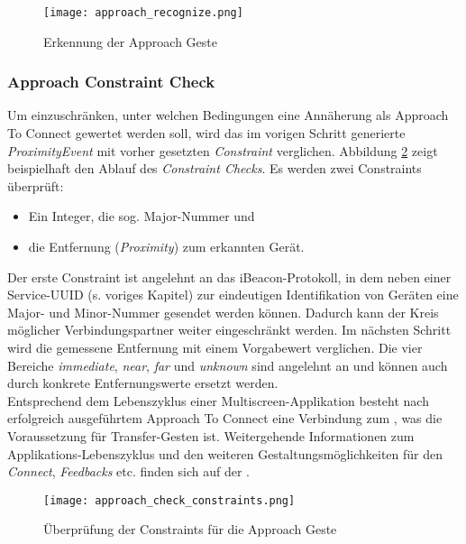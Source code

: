 {\begin{figure}[h]
\texttt{[image: approach\_recognize.png]}
\caption{Erkennung der Approach Geste}
\label{recognize_approach}
\end{figure}

\subsubsection*{Approach Constraint Check}
Um einzuschränken, unter welchen Bedingungen eine Annäherung als Approach To Connect gewertet werden soll, wird das im vorigen Schritt generierte \textit{ProximityEvent} mit vorher gesetzten \textit{Constraint} verglichen. Abbildung \ref{check_approach_constraints} zeigt beispielhaft den Ablauf des \textit{Constraint Checks}. Es werden zwei Constraints überprüft:
\begin{itemize}
\item Ein Integer, die sog. Major-Nummer und
\item die Entfernung (\textit{Proximity}) zum erkannten Gerät.
\end{itemize}
Der erste Constraint ist angelehnt an das iBeacon-Protokoll, in dem neben einer Service-UUID (s. voriges Kapitel) zur eindeutigen Identifikation von Geräten eine Major- und Minor-Nummer gesendet werden können. Dadurch kann der Kreis möglicher Verbindungspartner weiter eingeschränkt werden.
Im nächsten Schritt wird die gemessene Entfernung mit einem Vorgabewert verglichen. Die vier Bereiche \textit{immediate}, \textit{near}, \textit{far} und \textit{unknown} sind angelehnt an \cite{Marquardt2015} und können auch durch konkrete Entfernungswerte ersetzt werden.\\

Entsprechend dem Lebenszyklus einer Multiscreen-Applikation besteht nach erfolgreich
ausgeführtem Approach To Connect eine Verbindung zum \recdev{}, was die Voraussetzung für Transfer-Gesten ist.
Weitergehende Informationen zum Applikations-Lebenszyklus und den weiteren
Gestaltungsmöglichkeiten für den \textit{Connect}, \textit{Feedbacks} etc. finden sich
auf der \developerpage.

\begin{figure}[h]
\texttt{[image: approach\_check\_constraints.png]}
\caption{Überprüfung der Constraints für die Approach Geste}
\label{check_approach_constraints}
\end{figure}
}


\newcommand{\authors}{Horst Schneider, Hochschule Mannheim\\
Dominick Madden, Hochschule Mannheim\\
Valentina Burjan, Hochschule Mannheim}
\newcommand{\versionhistory}{20.02.2017}
\newcommand{\dateofcreation}{15.08.2015}




